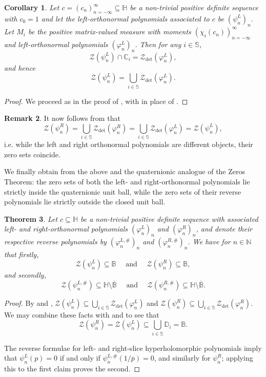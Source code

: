 \documentclass[11pt,reqno]{amsart}
\def\x{\chi}
\def\p{\varphi}
\def\q{\psi}
\def\NN{\mathbb{N}}
\def\CC{\mathbb{C}}
\def\DD{\mathbb{D}}
\def\BB{\mathbb{B}}
\def\SS{\mathbb{S}}
\def\HH{\mathbb{H}}
\def\cZ{\mathcal{Z}}
\newtheorem{theorem}{Theorem}[section]
\newtheorem{corollary}[theorem]{Corollary}
\theoremstyle{definition}
\newtheorem{remark}[theorem]{Remark}
\numberwithin{equation}{section}
\begin{document}
\begin{corollary}
    \label{cor:leftPolyZeros}
    Let \(c = (c_n)_{n=-\infty}^{\infty} \subseteq \HH\) be a non-trivial positive definite sequence with \(c_0 = 1\) and let the left-orthonormal polynomials associated to \(c\) be \((\q_n^L)_n\). Let \(M_i\) be the positive matrix-valued measure with moments \((\x_i(c_n))_{n=-\infty}^{\infty}\) and left-orthonormal polynomials \((\p_n^L)_n\). Then for any \(i \in \SS\),
    \[
        \cZ(\q_n^L) \cap \CC_i = \cZ_{\det}(\p_n^L),
    \]
    and hence
    \[
        \cZ(\q_n^L) = \bigcup_{i \in \SS} \cZ_{\det}(\p_n^L).
    \]
\end{corollary}
\begin{proof}
    We proceed as in the proof of , with  in place of .
\end{proof}

\begin{remark}
    \label{rem:zeroSetsEqual}
    It now follows from \cite[Theorem 3.8]{DPS08} that
    \[
        \cZ(\q_n^R) = \bigcup_{i \in \SS} \cZ_{\det}(\p_n^R) = \bigcup_{i\in\SS} \cZ_{\det}(\p_n^L) = \cZ(\q_n^L),
    \]
    i.e. while the left and right orthonormal polynomials are different objects, their zero sets coincide.
\end{remark}    

We finally obtain from the above and \cite[Theorem 3.7]{DPS08} the quaternionic analogue of the Zeros Theorem: the zero sets of both the left- and right-orthonormal polynomials lie strictly inside the quaternionic unit ball, while the zero sets of their reverse polynomials lie strictly outside the closed unit ball.

\begin{theorem}
\label{thm:QuaternionicZerosThm}
    Let \(c \subseteq \HH\) be a non-trivial positive definite sequence with associated left- and right-orthonormal polynomials \((\p_n^L)_n\) and \((\p_n^R)_n\), and denote their respective reverse polynomials by \((\p_n^{L,\#})_n\) and \((\p_n^{R,\#})_n\). We have for \(n \in \NN\) that firstly,
    \[
        \cZ(\q_n^L) \subseteq \BB \quad \text{ and } \quad \cZ(\q_n^R) \subseteq \BB,
    \]
    and secondly,
    \[
        \cZ(\q_n^{L,\#}) \subseteq \HH \setminus \overline{\BB} \quad \text{ and } \quad \cZ(\q_n^{R,\#}) \subseteq \HH \setminus \overline{\BB}.
    \]
\end{theorem}
\begin{proof}
    By  and , \(\cZ(\q_n^L) \subseteq \bigcup_{i \in \SS} \cZ_{\det}(\p_n^L)\) and \(\cZ(\q_n^R) \subseteq \bigcup_{i \in \SS} \cZ_{\det}(\p_n^R)\). We may combine these facts with \cite[Theorem 3.7]{DPS08} and  to see that
    \[
        \cZ(\q_n^R) = \cZ(\q_n^L) \subseteq \bigcup_{i\in\SS} \DD_i = \BB.
    \]

    The reverse formulae for left- and right-slice hyperholomorphic polynomials imply that \(\q_n^L(p) = 0\) if and only if \(\q_n^{L,\#}(1/\overline{p}) = 0\), and similarly for \(\q_n^R\); applying this to the first claim proves the second.
\end{proof}
\end{document}
